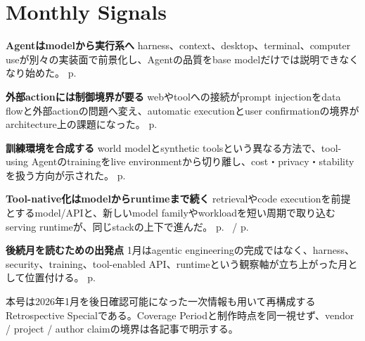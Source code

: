 \section*{Monthly Signals}
\smallskip
\noindent \textbf{Agentはmodelから実行系へ} harness、context、desktop、terminal、computer useが別々の実装面で前景化し、Agentの品質をbase modelだけでは説明できなくなり始めた。 \hfill{\footnotesize p.~\pageref{pkg:agent-stack-leaves-chat}}
\par
\smallskip
\noindent \textbf{外部actionには制御境界が要る} webやtoolへの接続がprompt injectionをdata flowと外部actionの問題へ変え、automatic executionとuser confirmationの境界がarchitecture上の課題になった。 \hfill{\footnotesize p.~\pageref{pkg:autonomy-needs-guardrails}}
\par
\smallskip
\noindent \textbf{訓練環境を合成する} world modelとsynthetic toolsという異なる方法で、tool-using Agentのtrainingをlive environmentから切り離し、cost・privacy・stabilityを扱う方向が示された。 \hfill{\footnotesize p.~\pageref{pkg:training-agents-offline}}
\par
\smallskip
\noindent \textbf{Tool-native化はmodelからruntimeまで続く} retrievalやcode executionを前提とするmodel/APIと、新しいmodel familyやworkloadを短い周期で取り込むserving runtimeが、同じstackの上下で進んだ。 \hfill{\footnotesize p.~\pageref{pkg:tool-native-models} / p.~\pageref{pkg:runtime-catches-the-agent-wave}}
\par
\smallskip
\noindent \textbf{後続月を読むための出発点} 1月はagentic engineeringの完成ではなく、harness、security、training、tool-enabled API、runtimeという観察軸が立ち上がった月として位置付ける。 \hfill{\footnotesize p.~\pageref{pkg:closing-synthesis}}
\par
\medskip
\begin{claimboundary}
本号は2026年1月を後日確認可能になった一次情報も用いて再構成するRetrospective Specialである。Coverage Periodと制作時点を同一視せず、vendor / project / author claimの境界は各記事で明示する。
\end{claimboundary}
\medskip
\tableofcontents
